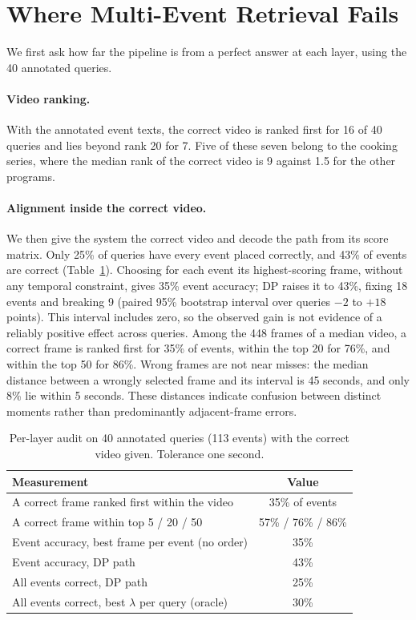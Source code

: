 \section{Where Multi-Event Retrieval Fails}
\label{sec:diagnosis}

We first ask how far the pipeline is from a perfect answer at each layer, using the 40 annotated queries.

\paragraph{Video ranking.}
With the annotated event texts, the correct video is ranked first for 16 of 40 queries and lies beyond rank 20 for 7.
Five of these seven belong to the cooking series, where the median rank of the correct video is 9 against 1.5 for the other programs.

\paragraph{Alignment inside the correct video.}
We then give the system the correct video and decode the path from its score matrix.
Only 25\% of queries have every event placed correctly, and 43\% of events are correct (Table~\ref{tab:layers}).
Choosing for each event its highest-scoring frame, without any temporal constraint, gives 35\% event accuracy; DP raises it to 43\%, fixing 18 events and breaking 9 (paired 95\% bootstrap interval over queries $-2$ to $+18$ points).
This interval includes zero, so the observed gain is not evidence of a reliably positive effect across queries.
Among the 448 frames of a median video, a correct frame is ranked first for 35\% of events, within the top 20 for 76\%, and within the top 50 for 86\%.
Wrong frames are not near misses: the median distance between a wrongly selected frame and its interval is 45 seconds, and only 8\% lie within 5 seconds.
These distances indicate confusion between distinct moments rather than predominantly adjacent-frame errors.

\begin{table}[t]
\centering
\caption{Per-layer audit on 40 annotated queries (113 events) with the correct video given. Tolerance one second.}
\label{tab:layers}
\begin{tabular}{lc}
\toprule
Measurement & Value \\
\midrule
A correct frame ranked first within the video & 35\% of events \\
A correct frame within top 5 / 20 / 50 & 57\% / 76\% / 86\% \\
Event accuracy, best frame per event (no order) & 35\% \\
Event accuracy, DP path & 43\% \\
All events correct, DP path & 25\% \\
All events correct, best $\lambda$ per query (oracle) & 30\% \\
\bottomrule
\end{tabular}
\end{table}


